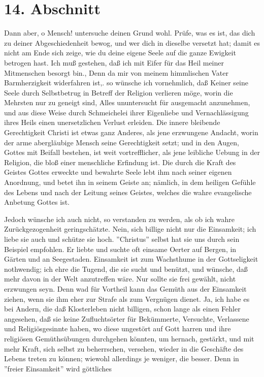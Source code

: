 \section{14. Abschnitt} \label{kap5_ab14}

Dann aber, o Mensch! untersuche deinen Grund wohl. Prüfe, was es ist, das dich
zu deiner Abgeschiedenheit bewog, und wer dich in dieselbe versetzt hat; damit
es nicht am Ende sich zeige, wie du deine eigene Seele auf die ganze Ewigkeit
betrogen hast. Ich muß gestehen, daß ich mit Eifer für das Heil meiner
Mitmenschen besorgt bin., Denn da mir von meinem himmlischen Vater
Barmherzigkeit widerfahren ist,. so wünsche ich vornehmlich, daß Keiner seine
Seele durch Selbstbetrug in Betreff der Religion verlieren möge, worin die
Mehrsten nur zu geneigt sind, Alles ununtersucht für ausgemacht anzunehmen, und
aus diese Weise durch Schmeichelei ihrer Eigenliebe und Vernachlässigung ihres
Heils einen unersetzlichen Verlust erleiden. Die innere bleibende Gerechtigkeit
Christi ist etwas ganz Anderes, als jene erzwungene Andacht, worin der arme
abergläubige Mensch seine Gerechtigkeit setzt; und in den Augen, Gottes mit
Beifall bestehen, ist weit vortrefflicher, als jene leibliche Uebung in der
Religion, die bloß einer menschliche Erfindung ist. Die durch die Kraft des
Geistes Gottes erweckte und bewahrte Seele lebt ihm nach seiner eigenen
Anordnung, und betet ihn in seinem Geiste an; nämlich, in dem heiligen Gefühle
des Lebens und nach der Leitung seines Geistes, welches die wahre evangelische
Anbetung Gottes ist.

\medskip


Jedoch wünsche ich auch nicht, so verstanden zu werden, als ob ich wahre
Zurückgezogenheit geringschätzte. Nein, sich billige nicht nur die Einsamkeit;
ich liebe sie auch und schütze sie hoch. ''Christus'' selbst hat sie uns durch
sein Beispiel empfohlen. Er liebte und suchte oft einsame Oerter auf Bergen, in
Gärten und an Seegestaden. Einsamkeit ist zum Wachsthume in der Gottseligkeit
nothwendig; ich ehre die Tugend, die sie sucht und benützt, und wünsche, daß
mehr davon in der Welt anzutreffen wäre. Nur sollte sie frei gewählt, nicht
erzwungen seyn. Denn wad für Vortheil kann das Gemüth aus der Einsamkeit ziehen,
wenn sie ihm eher zur Strafe als zum Vergnügen dienet. Ja, ich habe es bei
Andern, die daß Klosterleben nicht billigen, schon lange als einen Fehler
angesehen, daß sie keine Zufluchtsörter für Bekümmerte, Versuchte, Verlassene
und Religiösgesinnte haben, wo diese ungestört auf Gott harren und ihre
religiösen Gemüthsübungen durchgehen könnten, um hernach, gestärkt, und mit mehr
Kraft, sich selbst zu beherrschen, versehen, wieder in die Geschäfte des Lebens
treten zu können; wiewohl allerdings je weniger, die besser. Denn in ''freier
Einsamkeit'' wird göttliches 



